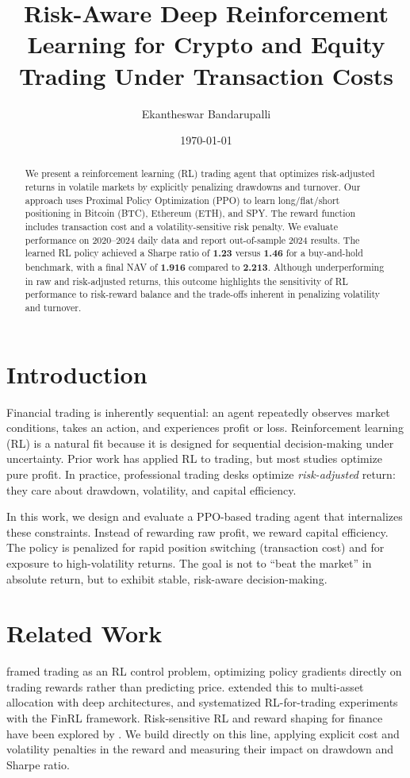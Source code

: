 \documentclass[12pt]{article}
\title{Risk-Aware Deep Reinforcement Learning for Crypto and Equity Trading Under Transaction Costs}
\author{Ekantheswar Bandarupalli}
\date{\today}
\begin{document}
\maketitle

\begin{abstract}
We present a reinforcement learning (RL) trading agent that optimizes risk-adjusted returns in volatile markets by explicitly penalizing drawdowns and turnover. Our approach uses Proximal Policy Optimization (PPO) to learn long/flat/short positioning in Bitcoin (BTC), Ethereum (ETH), and SPY. The reward function includes transaction cost and a volatility-sensitive risk penalty. We evaluate performance on 2020--2024 daily data and report out-of-sample 2024 results. The learned RL policy achieved a Sharpe ratio of \textbf{1.23} versus \textbf{1.46} for a buy-and-hold benchmark, with a final NAV of \textbf{1.916} compared to \textbf{2.213}. Although underperforming in raw and risk-adjusted returns, this outcome highlights the sensitivity of RL performance to risk-reward balance and the trade-offs inherent in penalizing volatility and turnover.
\end{abstract}

\section{Introduction}
Financial trading is inherently sequential: an agent repeatedly observes market conditions, takes an action, and experiences profit or loss. Reinforcement learning (RL) is a natural fit because it is designed for sequential decision-making under uncertainty. Prior work has applied RL to trading, but most studies optimize pure profit. In practice, professional trading desks optimize \textit{risk-adjusted} return: they care about drawdown, volatility, and capital efficiency.

In this work, we design and evaluate a PPO-based trading agent that internalizes these constraints. Instead of rewarding raw profit, we reward capital efficiency. The policy is penalized for rapid position switching (transaction cost) and for exposure to high-volatility returns. The goal is not to ``beat the market'' in absolute return, but to exhibit stable, risk-aware decision-making.

\section{Related Work}
\citet{moody2001} framed trading as an RL control problem, optimizing policy gradients directly on trading rewards rather than predicting price. \citet{jiang2017} extended this to multi-asset allocation with deep architectures, and \citet{liu2021} systematized RL-for-trading experiments with the FinRL framework. Risk-sensitive RL and reward shaping for finance have been explored by \citet{li2019}. We build directly on this line, applying explicit cost and volatility penalties in the reward and measuring their impact on drawdown and Sharpe ratio.
\end{document}
